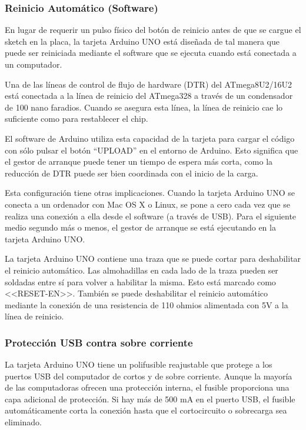 \subsubsection{Reinicio Automático (Software)}
En lugar de requerir un pulso físico del botón de reinicio antes de que se cargue el sketch en la placa, la tarjeta Arduino UNO está diseñada de tal manera que puede ser reiniciada mediante el software que se ejecuta cuando está conectada a un computador.



Una de las líneas de control de flujo de hardware (DTR) del ATmega8U2/16U2 está conectada a la línea de reinicio del ATmega328 a través de un condensador de 100 nano faradios. Cuando se asegura esta línea, la línea de reinicio cae lo suficiente como para restablecer el chip. 



El software de Arduino utiliza esta capacidad de la tarjeta para cargar el código con sólo pulsar el botón “UPLOAD” en el entorno de Arduino. Esto significa que el gestor de arranque puede tener un tiempo de espera más corta, como la reducción de DTR puede ser bien coordinada con el inicio de la carga.



Esta configuración tiene otras implicaciones. Cuando la tarjeta Arduino UNO se conecta a un ordenador con Mac OS X o Linux, se pone a cero cada vez que se realiza una conexión a ella desde el software (a través de USB). Para el siguiente medio segundo más o menos, el gestor de arranque se está ejecutando en la tarjeta Arduino UNO. 



La tarjeta Arduino UNO contiene una traza que se puede cortar para deshabilitar el reinicio automático. Las almohadillas en cada lado de la traza pueden ser soldadas entre sí para volver a habilitar la misma. Esto está marcado como <<RESET-EN>>. También se puede deshabilitar el reinicio automático mediante la conexión de una resistencia de 110 ohmios alimentada con 5V a la línea de reinicio.



\subsubsection{Protección USB contra sobre corriente}
La tarjeta Arduino UNO tiene un polifusible reajustable que protege a los puertos USB del computador de cortos y de sobre corriente. Aunque la mayoría de las computadoras ofrecen una protección interna, el fusible proporciona una capa adicional de protección. Si hay más de 500 mA en el puerto USB, el fusible automáticamente corta la conexión hasta que el cortocircuito o sobrecarga sea eliminado.




